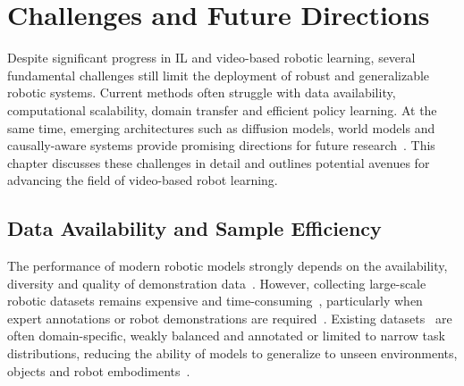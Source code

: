 \chapter{Challenges and Future Directions}
\label{chap:ChallengesAndFutureDirections}
\minitoc
Despite significant progress in \ac{IL} and video-based robotic learning, several fundamental challenges still limit the deployment of robust and generalizable robotic systems. Current methods often struggle with data availability, computational scalability, domain transfer and efficient policy learning. At the same time, emerging architectures such as diffusion models, world models and causally-aware systems provide promising directions for future research~\cite{Eze2024LearningBW}. This chapter discusses these challenges in detail and outlines potential avenues for advancing the field of video-based robot learning.


\section{Data Availability and Sample Efficiency}

The performance of modern robotic models strongly depends on the availability, diversity and quality of demonstration data~\cite{Eze2024LearningBW}. However, collecting large-scale robotic datasets remains expensive and time-consuming~\cite{McCarthy_2025}, particularly when expert annotations or robot demonstrations are required~\cite{Fang2018Demo2VecRO, ChaneSane2023LearningVP}. Existing datasets~\cite{Damen2018ScalingEV, Goyal2017TheS, Kuehne2011HMDBAL, Andriluka20142DHP, Zhang2013FromAT} are often domain-specific, weakly balanced and annotated or limited to narrow task distributions, reducing the ability of models to generalize to unseen environments, objects and robot embodiments~\cite{Eze2024LearningBW}.

